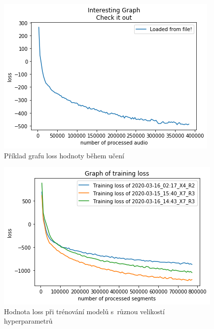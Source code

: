 \begin{figure}[H]
    \centering
    \includegraphics[scale=0.55]{obrazky-figures/some-loss.png}
    \caption{\label{fig:somelossTODO}Příklad grafu loss hodnoty během učení}
\end{figure}

\begin{figure}[H]
    \centering
    \includegraphics[scale=0.55]{obrazky-figures/loss_triple.png}
    \caption{\label{fig:somelossTODO2}Hodnota loss při trénování modelů s~různou velikostí hyperparametrů}
\end{figure}



